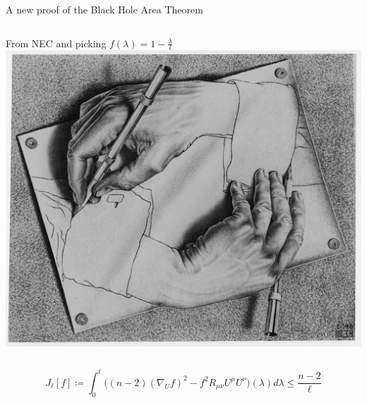 \documentclass[handout]{beamer}
\begin{document}
\begin{frame}{A new proof of the Black Hole Area Theorem}
\begin{columns}
			From NEC and picking \(f(\lambda) = 1 - \frac{\lambda}{\ell}\)
			\includegraphics[scale=0.15]{Immagini/escher.jpg}
		\end{columns}
		\vskip 7pt
		\[
		J_{\ell}[f] \coloneqq \int_{0}^{\ell} \big((n -2)(\nabla_Uf)^2 - f^2R_{\mu\nu}U^{\mu}U^{\nu} \big)(\lambda) d\lambda \le \frac{n - 2}{\ell}
		\]

	\end{frame}
\end{document}
